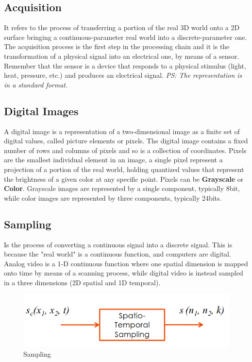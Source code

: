 \subsection{Acquisition}
It refers to the process of transferring a portion of the real 3D world onto a 2D surface bringing a continuous-parameter real world into a discrete-parameter one. 
The acquisition process is the first step in the processing chain and it is the transformation of a physical signal into an electrical one, by means of a sensor. 
Remember that the sensor is a device that responds to a physical stimulus (light, heat, pressure, etc.) and produces an electrical signal. 
\textit{PS: The representation is in a standard format.}
\\
\subsection{Digital Images}
A digital image is a representation of a two-dimensional image as a finite set of digital values, called picture elements or pixels. 
The digital image contains a fixed number of rows and columns of pixels and so is a collection of coordinates. Pixels are the smallest individual element in an image, a single pixel represent a projection of a portion of the real world, holding quantized values that represent the brightness of a given color at any specific point. Pixels can be \textbf{Grayscale} or \textbf{Color}. 
Grayscale images are represented by a single component, typically 8bit, while color images are represented by three components, typically 24bits.
\\
\subsection{Sampling}
Is the process of converting a continuous signal into a discrete signal. This is because the "real world" is a continuous function, and computers are digital. Analog video is a 1-D continuous function where one spatial dimension is mapped onto time by means of a scanning process, while digital video is instead sampled in a three dimensions (2D spatial and 1D temporal).
\\
\begin{figure}[h]
    \centering
    \includegraphics[scale=0.5]{Figures/Sampling.png}
    \caption{Sampling}
    \label{fig:enter-label}
\end{figure}

